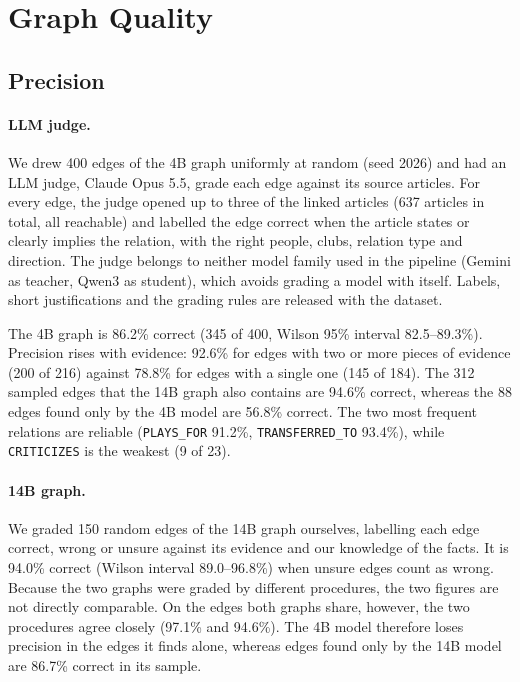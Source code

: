 \documentclass[11pt]{article}
\begin{document}
\section{Graph Quality}
\subsection{Precision}
\paragraph{LLM judge.} We drew 400 edges of the 4B graph uniformly at random (seed 2026) and had an LLM judge, Claude Opus 5.5, grade each edge against its source articles. For every edge, the judge opened up to three of the linked articles (637 articles in total, all reachable) and labelled the edge correct when the article states or clearly implies the relation, with the right people, clubs, relation type and direction. The judge belongs to neither model family used in the pipeline (Gemini as teacher, Qwen3 as student), which avoids grading a model with itself. Labels, short justifications and the grading rules are released with the dataset.

The 4B graph is 86.2\% correct (345 of 400, Wilson 95\% interval 82.5--89.3\%). Precision rises with evidence: 92.6\% for edges with two or more pieces of evidence (200 of 216) against 78.8\% for edges with a single one (145 of 184). The 312 sampled edges that the 14B graph also contains are 94.6\% correct, whereas the 88 edges found only by the 4B model are 56.8\% correct. The two most frequent relations are reliable (\texttt{PLAYS\_FOR} 91.2\%, \texttt{TRANSFERRED\_TO} 93.4\%), while \texttt{CRITICIZES} is the weakest (9 of 23).

\paragraph{14B graph.} We graded 150 random edges of the 14B graph ourselves, labelling each edge correct, wrong or unsure against its evidence and our knowledge of the facts. It is 94.0\% correct (Wilson interval 89.0--96.8\%) when unsure edges count as wrong. Because the two graphs were graded by different procedures, the two figures are not directly comparable. On the edges both graphs share, however, the two procedures agree closely (97.1\% and 94.6\%). The 4B model therefore loses precision in the edges it finds alone, whereas edges found only by the 14B model are 86.7\% correct in its sample.
\end{document}
